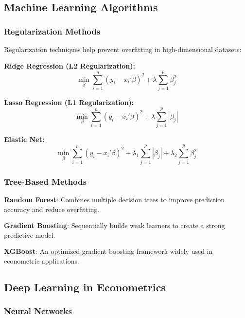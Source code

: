\documentclass[12pt,a4paper]{article}
\begin{document}
\subsection{Machine Learning Algorithms}

\subsubsection{Regularization Methods}

Regularization techniques help prevent overfitting in high-dimensional datasets:

\textbf{Ridge Regression (L2 Regularization):}
\begin{equation}
\min_{\beta} \sum_{i=1}^{n} (y_i - x_i'\beta)^2 + \lambda \sum_{j=1}^{p} \beta_j^2
\end{equation}

\textbf{Lasso Regression (L1 Regularization):}
\begin{equation}
\min_{\beta} \sum_{i=1}^{n} (y_i - x_i'\beta)^2 + \lambda \sum_{j=1}^{p} |\beta_j|
\end{equation}

\textbf{Elastic Net:}
\begin{equation}
\min_{\beta} \sum_{i=1}^{n} (y_i - x_i'\beta)^2 + \lambda_1 \sum_{j=1}^{p} |\beta_j| + \lambda_2 \sum_{j=1}^{p} \beta_j^2
\end{equation}

\subsubsection{Tree-Based Methods}

\textbf{Random Forest}: Combines multiple decision trees to improve prediction accuracy and reduce overfitting.

\textbf{Gradient Boosting}: Sequentially builds weak learners to create a strong predictive model.

\textbf{XGBoost}: An optimized gradient boosting framework widely used in econometric applications.

\subsection{Deep Learning in Econometrics}

\subsubsection{Neural Networks}
\end{document}
